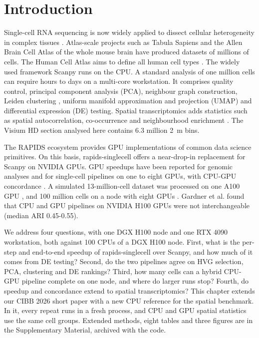 \documentclass[runningheads]{llncs}
\begin{document}
\hypertarget{introduction}{%
\section{Introduction}\label{introduction}}

Single-cell RNA sequencing is now widely applied to dissect cellular heterogeneity in complex tissues \cite{Heumos2023}.
Atlas-scale projects such as Tabula Sapiens \cite{TabulaSapiens2022} and the Allen Brain Cell Atlas of the whole mouse brain \cite{Yao2023} have produced datasets of millions of cells.
The Human Cell Atlas aims to define all human cell types \cite{Regev2017}.
The widely used framework Scanpy \cite{Wolf2018} runs on the CPU.
A standard analysis of one million cells can require hours to days on a multi-core workstation.
It comprises quality control, principal component analysis (PCA), neighbour graph construction, Leiden clustering \cite{Traag2019}, uniform manifold approximation and projection (UMAP) \cite{McInnes2018} and differential expression (DE) testing.
Spatial transcriptomics adds statistics such as spatial autocorrelation, co-occurrence and neighbourhood enrichment \cite{Palla2022}.
The Visium HD section analysed here contains 6.3 million 2~\textmu{}m bins.

The RAPIDS ecosystem \cite{RAPIDS2024} provides GPU implementations of common data science primitives.
On this basis, rapids-singlecell \cite{Dicks2026} offers a near-drop-in replacement for Scanpy on NVIDIA GPUs.
GPU speedups have been reported for genomic analyses \cite{TaylorWeiner2019} and for single-cell pipelines on one to eight GPUs, with CPU-GPU concordance \cite{Nolet2022}.
A simulated 13-million-cell dataset was processed on one A100 GPU \cite{Hu2025}, and 100 million cells on a node with eight GPUs \cite{Dicks2026}.
Gardner et al. \cite{Gardner2025} found that CPU and GPU pipelines on NVIDIA H100 GPUs were not interchangeable (median ARI 0.45-0.55).

We address four questions, with one DGX H100 node and one RTX 4090 workstation, both against 100 CPUs of a DGX H100 node.
First, what is the per-step and end-to-end speedup of rapids-singlecell over Scanpy, and how much of it comes from DE testing?
Second, do the two pipelines agree on HVG selection, PCA, clustering and DE rankings?
Third, how many cells can a hybrid CPU-GPU pipeline complete on one node, and where do larger runs stop?
Fourth, do speedup and concordance extend to spatial transcriptomics?
This chapter extends our CIBB 2026 short paper with a new CPU reference for the spatial benchmark.
In it, every repeat runs in a fresh process, and CPU and GPU spatial statistics use the same cell groups.
Extended methods, eight tables and three figures are in the Supplementary Material, archived with the code.
\end{document}
